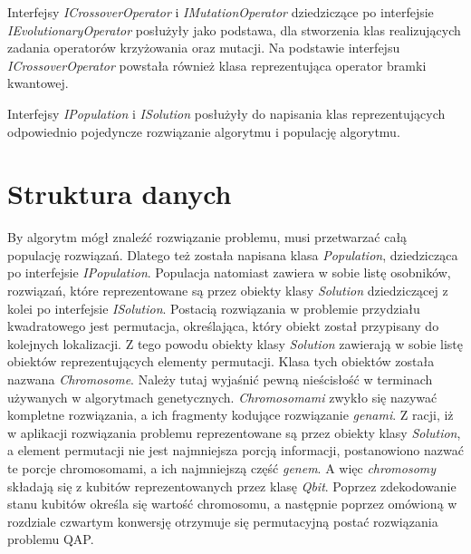 Interfejsy \textit{ICrossoverOperator} i \textit{IMutationOperator} dziedziczące po interfejsie \textit{IEvolutionaryOperator} posłużyły jako podstawa, dla stworzenia klas realizujących zadania operatorów krzyżowania oraz mutacji. Na podstawie interfejsu \textit{ICrossoverOperator} powstała również klasa reprezentująca operator bramki kwantowej.

Interfejsy \textit{IPopulation} i \textit{ISolution} posłużyły do napisania klas reprezentujących odpowiednio pojedyncze rozwiązanie algorytmu i populację algorytmu.

\section{Struktura danych}
By algorytm mógł znaleźć rozwiązanie problemu, musi przetwarzać całą populację rozwiązań. Dlatego też została napisana klasa \textit{Population}, dziedzicząca po interfejsie \textit{IPopulation}. Populacja natomiast zawiera w sobie listę osobników, rozwiązań, które reprezentowane są przez obiekty klasy \textit{Solution} dziedziczącej z kolei po interfejsie \textit{ISolution}. Postacią rozwiązania w problemie przydziału kwadratowego jest permutacja, określająca, który obiekt został przypisany do kolejnych lokalizacji. Z tego powodu obiekty klasy \textit{Solution} zawierają w sobie listę obiektów reprezentujących elementy permutacji. Klasa tych obiektów została nazwana \textit{Chromosome}. Należy tutaj wyjaśnić pewną nieścisłość w terminach używanych w algorytmach genetycznych. \textit{Chromosomami} zwykło się nazywać kompletne rozwiązania, a ich fragmenty kodujące rozwiązanie \textit{genami}. Z racji, iż w aplikacji rozwiązania problemu reprezentowane są przez obiekty klasy \textit{Solution}, a element permutacji nie jest najmniejsza porcją informacji, postanowiono nazwać te porcje chromosomami, a ich najmniejszą część \textit{genem}. A więc \textit{chromosomy} składają się z kubitów reprezentowanych przez klasę \textit{Qbit}. Poprzez zdekodowanie stanu kubitów określa się wartość chromosomu, a następnie poprzez omówioną w rozdziale czwartym konwersję otrzymuje się permutacyjną postać rozwiązania problemu QAP.
\newpage
